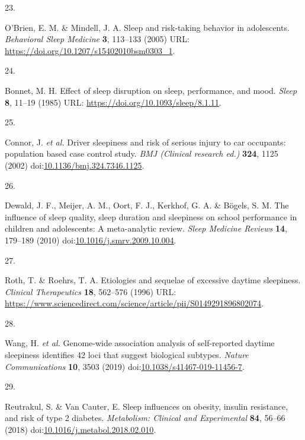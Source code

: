 \documentclass[
  10pt,
]{scrbook}
\newlength{\cslhangindent}
\newlength{\csllabelwidth}
\newlength{\cslentryspacingunit} %
\newenvironment{CSLReferences}[2] %
 {%
  \setlength{\parindent}{0pt}
  \ifodd #1
  \let\oldpar\par
  \def\par{\hangindent=\cslhangindent\oldpar}
  \fi
  \setlength{\parskip}{#2\cslentryspacingunit}
 }%
 {}
\newcommand{\CSLLeftMargin}[1]{\parbox[t]{\csllabelwidth}{#1}}
\newcommand{\CSLRightInline}[1]{\parbox[t]{\linewidth - \csllabelwidth}{#1}\break}
\begin{document}
\begin{CSLReferences}{0}{0}
\leavevmode{}%
\CSLLeftMargin{23. }%
\CSLRightInline{O'Brien, E. M. \& Mindell, J. A. Sleep and risk-taking
behavior in adolescents. \emph{Behavioral Sleep Medicine} \textbf{3},
113--133 (2005) URL: \url{https://doi.org/10.1207/s15402010bsm0303_1}.}

\leavevmode{}%
\CSLLeftMargin{24. }%
\CSLRightInline{Bonnet, M. H. Effect of sleep disruption on sleep,
performance, and mood. \emph{Sleep} \textbf{8}, 11--19 (1985) URL:
\url{https://doi.org/10.1093/sleep/8.1.11}.}

\leavevmode{}%
\CSLLeftMargin{25. }%
\CSLRightInline{Connor, J. \emph{et al.} Driver sleepiness and risk of
serious injury to car occupants: population based case control study.
\emph{BMJ (Clinical research ed.)} \textbf{324}, 1125 (2002)
doi:\href{https://doi.org/10.1136/bmj.324.7346.1125}{10.1136/bmj.324.7346.1125}.}

\leavevmode{}%
\CSLLeftMargin{26. }%
\CSLRightInline{Dewald, J. F., Meijer, A. M., Oort, F. J., Kerkhof, G.
A. \& Bögels, S. M. The influence of sleep quality, sleep duration and
sleepiness on school performance in children and adolescents: A
meta-analytic review. \emph{Sleep Medicine Reviews} \textbf{14},
179--189 (2010)
doi:\href{https://doi.org/10.1016/j.smrv.2009.10.004}{10.1016/j.smrv.2009.10.004}.}

\leavevmode{}%
\CSLLeftMargin{27. }%
\CSLRightInline{Roth, T. \& Roehrs, T. A. Etiologies and sequelae of
excessive daytime sleepiness. \emph{Clinical Therapeutics} \textbf{18},
562--576 (1996) URL:
\url{https://www.sciencedirect.com/science/article/pii/S0149291896802074}.}

\leavevmode{}%
\CSLLeftMargin{28. }%
\CSLRightInline{Wang, H. \emph{et al.} Genome-wide association analysis
of self-reported daytime sleepiness identifies 42 loci that suggest
biological subtypes. \emph{Nature Communications} \textbf{10}, 3503
(2019)
doi:\href{https://doi.org/10.1038/s41467-019-11456-7}{10.1038/s41467-019-11456-7}.}

\leavevmode{}%
\CSLLeftMargin{29. }%
\CSLRightInline{Reutrakul, S. \& Van Cauter, E. Sleep influences on
obesity, insulin resistance, and risk of type 2 diabetes.
\emph{Metabolism: Clinical and Experimental} \textbf{84}, 56--66 (2018)
doi:\href{https://doi.org/10.1016/j.metabol.2018.02.010}{10.1016/j.metabol.2018.02.010}.}


\end{CSLReferences}
\end{document}
